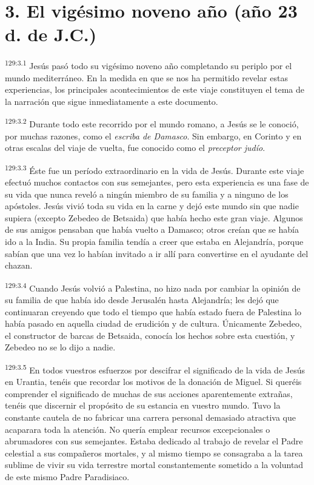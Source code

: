 \section*{3. El vigésimo noveno año (año 23 d. de J.C.)}
\par 
\textsuperscript{129:3.1} Jesús pasó todo su vigésimo noveno año completando su periplo por el mundo mediterráneo. En la medida en que se nos ha permitido revelar estas experiencias, los principales acontecimientos de este viaje constituyen el tema de la narración que sigue inmediatamente a este documento.

\par 
\textsuperscript{129:3.2} Durante todo este recorrido por el mundo romano, a Jesús se le conoció, por muchas razones, como el \textit{escriba de Damasco}. Sin embargo, en Corinto y en otras escalas del viaje de vuelta, fue conocido como el \textit{preceptor judío}.

\par 
\textsuperscript{129:3.3} Éste fue un período extraordinario en la vida de Jesús. Durante este viaje efectuó muchos contactos con sus semejantes, pero esta experiencia es una fase de su vida que nunca reveló a ningún miembro de su familia y a ninguno de los apóstoles. Jesús vivió toda su vida en la carne y dejó este mundo sin que nadie supiera (excepto Zebedeo de Betsaida) que había hecho este gran viaje. Algunos de sus amigos pensaban que había vuelto a Damasco; otros creían que se había ido a la India. Su propia familia tendía a creer que estaba en Alejandría, porque sabían que una vez lo habían invitado a ir allí para convertirse en el ayudante del chazan.

\par 
\textsuperscript{129:3.4} Cuando Jesús volvió a Palestina, no hizo nada por cambiar la opinión de su familia de que había ido desde Jerusalén hasta Alejandría; les dejó que continuaran creyendo que todo el tiempo que había estado fuera de Palestina lo había pasado en aquella ciudad de erudición y de cultura. Únicamente Zebedeo, el constructor de barcas de Betsaida, conocía los hechos sobre esta cuestión, y Zebedeo no se lo dijo a nadie.

\par 
\textsuperscript{129:3.5} En todos vuestros esfuerzos por descifrar el significado de la vida de Jesús en Urantia, tenéis que recordar los motivos de la donación de Miguel. Si queréis comprender el significado de muchas de sus acciones aparentemente extrañas, tenéis que discernir el propósito de su estancia en vuestro mundo. Tuvo la constante cautela de no fabricar una carrera personal demasiado atractiva que acaparara toda la atención. No quería emplear recursos excepcionales o abrumadores con sus semejantes. Estaba dedicado al trabajo de revelar el Padre celestial a sus compañeros mortales, y al mismo tiempo se consagraba a la tarea sublime de vivir su vida terrestre mortal constantemente sometido a la voluntad de este mismo Padre Paradisiaco.

